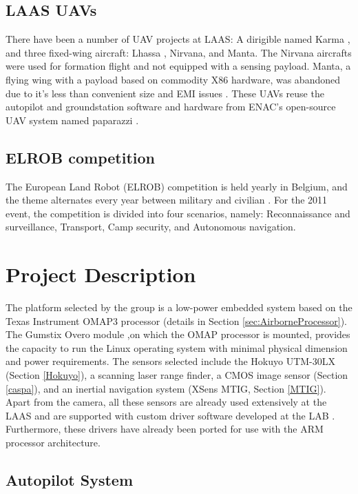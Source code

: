 \documentclass[a4paper,11pt]{report}
\begin{document}
\section{LAAS UAVs}

There have been a number of UAV projects at LAAS: A dirigible named Karma \cite{karma}, and three fixed-wing aircraft: Lhassa \cite{lhassa}, Nirvana, and Manta. The Nirvana aircrafts were used for formation flight \cite{gautier} and not equipped with a sensing payload. Manta, a flying wing with a payload based on commodity X86 hardware, was abandoned due to it's less than convenient size and EMI issues \cite{manta}. These UAVs reuse the autopilot and groundstation software and hardware from ENAC's open-source UAV system named paparazzi \cite{paparazzi}.

\section{ELROB competition}

The European Land Robot (ELROB) competition is held yearly in Belgium, and the theme alternates every year between military and civilian \cite{elrob}. For the 2011 event, the competition is divided into four scenarios, namely: Reconnaissance and surveillance, Transport, Camp security, and Autonomous navigation.

\chapter{Project Description}

The platform selected by the group is a low-power embedded system based on the Texas Instrument OMAP3 processor (details in Section \ref{sec:AirborneProcessor}). The Gumstix Overo module \cite{Overo},on which the OMAP processor is mounted, provides the capacity to run the Linux operating system with minimal physical dimension and power requirements. The sensors selected include the Hokuyo UTM-30LX (Section \ref{Hokuyo}), a scanning laser range finder, a CMOS image sensor (Section \ref{caspa}), and an inertial navigation system (XSens MTIG, Section \ref{MTIG}). Apart from the camera, all these sensors are already used extensively at the LAAS and are supported with custom driver software developed at the LAB \cite{robotpkg}. Furthermore, these drivers have already been ported for use with the ARM processor architecture.

\section{Autopilot System}
\end{document}
